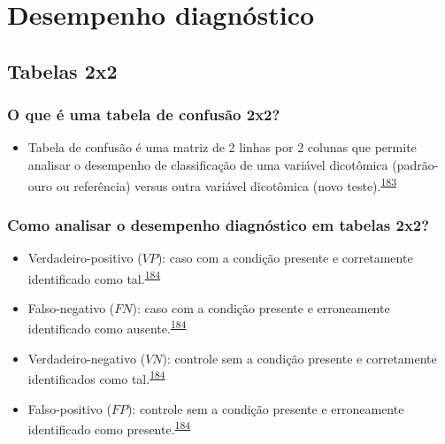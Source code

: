 \documentclass[
  a4paper,
]{book}
\providecommand{\tightlist}{%
  \setlength{\itemsep}{0pt}\setlength{\parskip}{0pt}}
\begin{document}
\hypertarget{analise-desempenho-diagnostico}{%
\chapter{\texorpdfstring{\textbf{Desempenho diagnóstico}}{Desempenho diagnóstico}}\label{analise-desempenho-diagnostico}}

\hypertarget{tabelas-2x2}{%
\section{Tabelas 2x2}\label{tabelas-2x2}}

\hypertarget{o-que-uxe9-uma-tabela-de-confusuxe3o-2x2}{%
\subsection{O que é uma tabela de confusão 2x2?}\label{o-que-uxe9-uma-tabela-de-confusuxe3o-2x2}}

\begin{itemize}
\tightlist
\item
  Tabela de confusão é uma matriz de 2 linhas por 2 colunas que permite analisar o desempenho de classificação de uma variável dicotômica (padrão-ouro ou referência) versus outra variável dicotômica (novo teste).\textsuperscript{\protect\hyperlink{ref-steckelberg2004}{183}}
\end{itemize}

\hypertarget{como-analisar-o-desempenho-diagnuxf3stico-em-tabelas-2x2}{%
\subsection{Como analisar o desempenho diagnóstico em tabelas 2x2?}\label{como-analisar-o-desempenho-diagnuxf3stico-em-tabelas-2x2}}

\begin{itemize}
\item
  Verdadeiro-positivo (\(VP\)): caso com a condição presente e corretamente identificado como tal.\textsuperscript{\protect\hyperlink{ref-greenhalgh1997b}{184}}
\item
  Falso-negativo (\(FN\)): caso com a condição presente e erroneamente identificado como ausente.\textsuperscript{\protect\hyperlink{ref-greenhalgh1997b}{184}}
\item
  Verdadeiro-negativo (\(VN\)): controle sem a condição presente e corretamente identificados como tal.\textsuperscript{\protect\hyperlink{ref-greenhalgh1997b}{184}}
\item
  Falso-positivo (\(FP\)): controle sem a condição presente e erroneamente identificado como presente.\textsuperscript{\protect\hyperlink{ref-greenhalgh1997b}{184}}
\end{itemize}
\end{document}
